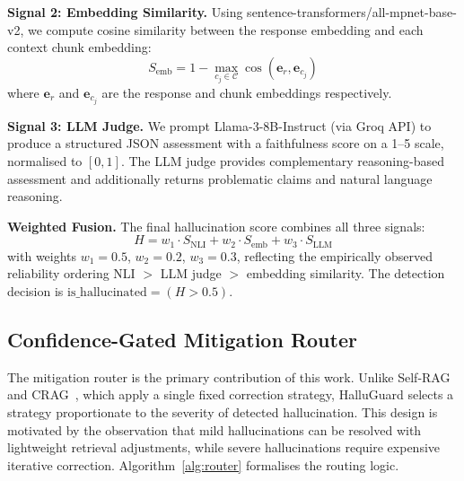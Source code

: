 \documentclass[conference]{IEEEtran}
\begin{document}
\medskip
\noindent\textbf{Signal 2: Embedding Similarity.} Using sentence-transformers/all-mpnet-base-v2, we compute cosine similarity between the response embedding and each context chunk embedding:
\begin{equation}
S_{\text{emb}} = 1 - \max_{c_j \in \mathcal{C}} \cos(\mathbf{e}_r, \mathbf{e}_{c_j})
\label{eq:emb}
\end{equation}
where $\mathbf{e}_r$ and $\mathbf{e}_{c_j}$ are the response and chunk embeddings respectively.

\medskip
\noindent\textbf{Signal 3: LLM Judge.} We prompt Llama-3-8B-Instruct (via Groq API) to produce a structured JSON assessment with a faithfulness score on a 1--5 scale, normalised to $[0, 1]$. The LLM judge provides complementary reasoning-based assessment and additionally returns problematic claims and natural language reasoning.

\medskip
\noindent\textbf{Weighted Fusion.} The final hallucination score combines all three signals:
\begin{equation}
H = w_1 \cdot S_{\text{NLI}} + w_2 \cdot S_{\text{emb}} + w_3 \cdot S_{\text{LLM}}
\label{eq:fusion}
\end{equation}
with weights $w_1 = 0.5$, $w_2 = 0.2$, $w_3 = 0.3$, reflecting the empirically observed reliability ordering NLI $>$ LLM judge $>$ embedding similarity. The detection decision is $\text{is\_hallucinated} = (H > 0.5)$.

\subsection{Confidence-Gated Mitigation Router}

The mitigation router is the primary contribution of this work. Unlike Self-RAG~\cite{asai2024selfrag} and CRAG~\cite{yan2024crag}, which apply a single fixed correction strategy, HalluGuard selects a strategy proportionate to the severity of detected hallucination. This design is motivated by the observation that mild hallucinations can be resolved with lightweight retrieval adjustments, while severe hallucinations require expensive iterative correction. Algorithm~\ref{alg:router} formalises the routing logic.
\end{document}
